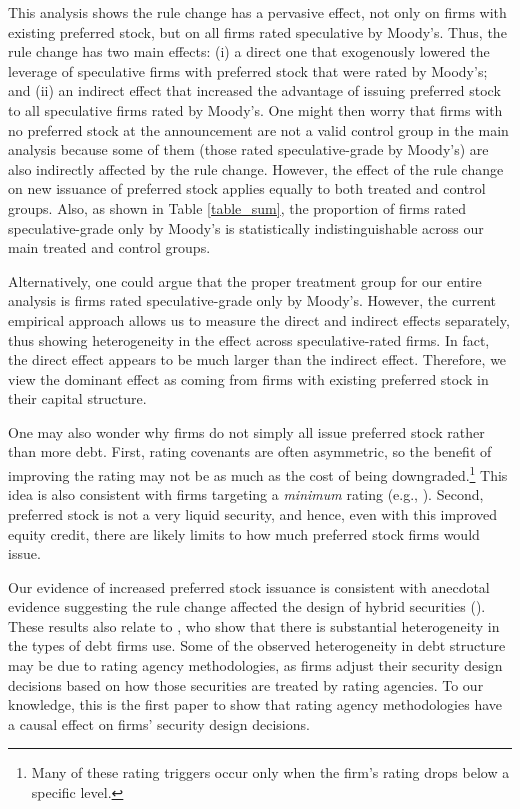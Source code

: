 \documentclass[a4paper, 12pt]{article}
\begin{document}
This analysis shows the rule change has a pervasive effect, not only on firms with existing preferred stock, but on all firms rated speculative by Moody's. Thus, the rule change has two main effects: (i) a direct one that exogenously lowered the leverage of speculative firms with preferred stock that were rated by Moody's; and (ii) an indirect effect that increased the advantage of issuing preferred stock to all speculative firms rated by Moody's. One might then worry that firms with no preferred stock at the announcement are not a valid control group in the main analysis because some of them (those rated speculative-grade by Moody's) are also indirectly affected by the rule change. However, the effect of the rule change on new issuance of preferred stock applies equally to both treated and control groups. Also, as shown in Table \ref{table_sum}, the proportion of firms rated speculative-grade only by Moody's is statistically indistinguishable across our main treated and control groups.

Alternatively, one could argue that the proper treatment group for our entire analysis is firms rated speculative-grade only by Moody's. However, the current empirical approach allows us to measure the direct and indirect effects separately, thus showing heterogeneity in the effect across speculative-rated firms. In fact, the direct effect appears to be much larger than the indirect effect. Therefore, we view the dominant effect as coming from firms with existing preferred stock in their capital structure.


One may also wonder why firms do not simply all issue preferred stock rather than more debt. First, rating covenants are often asymmetric, so the benefit of improving the rating may not be as much as the cost of being downgraded.\footnote{Many of these rating triggers occur only when the firm's rating drops below a specific level.} This idea is also consistent with firms targeting a \textit{minimum} rating (e.g., \citealp{hovakimian2009credit}). Second, preferred stock is not a very liquid security, and hence, even with this improved equity credit, there are likely limits to how much preferred stock firms would issue.

Our evidence of increased preferred stock issuance is consistent with anecdotal evidence suggesting the rule change affected the design of hybrid securities (\citealp{wsj}). These results also relate to \cite{rauh2010capital}, who show that there is substantial heterogeneity in the types of debt firms use. Some of the observed heterogeneity in debt structure may be due to rating agency methodologies, as firms adjust their security design decisions based on how those securities are treated by rating agencies. To our knowledge, this is the first paper to show that rating agency methodologies have a causal effect on firms' security design decisions.
\end{document}
